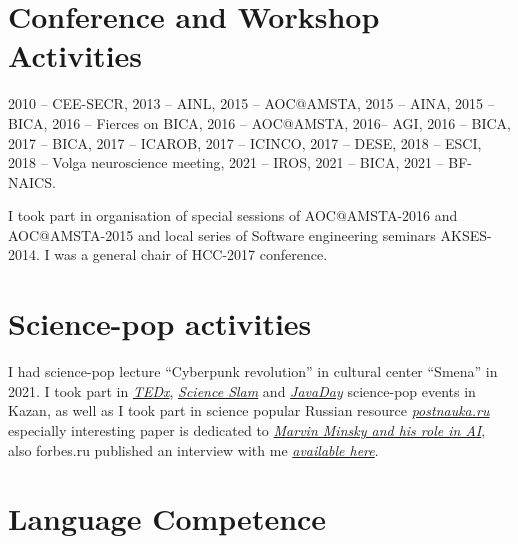 \documentclass{moderncv}
\begin{document}
\nocite{*}
\printbibliography[title={Selected papers}]

    \section{Conference and Workshop Activities}
    2010 -- CEE-SECR, 2013 -- AINL, 2015 -- AOC@AMSTA, 2015 -- AINA, 2015 -- BICA, 2016 -- Fierces on BICA, 2016 -- AOC@AMSTA, 2016-- AGI, 2016 -- BICA, 2017 -- BICA, 2017 -- ICAROB, 2017 -- ICINCO, 2017 -- DESE, 2018 -- ESCI, 2018 -- Volga neuroscience meeting, 2021 -- IROS, 2021 -- BICA, 2021 -- BF-NAICS.

    I took part in organisation of special sessions of AOC@AMSTA-2016 and AOC@AMSTA-2015 and local series of Software engineering seminars AKSES-2014. I was a general chair of HCC-2017 conference.

    \section{Science-pop activities}
    I had science-pop lecture ``Cyberpunk revolution'' in cultural center ``Smena'' in 2021.
    I took part in \href{https://www.youtube.com/watch?v=BLvS7h3kRbo}{\emph{TEDx}}, \href{https://vk.com/video-87488544_171504962}{\emph{Science Slam}} and \href{https://www.youtube.com/watch?v=sLLKxvUEA7E}{\emph{JavaDay}} science-pop events in Kazan, as well as I took part in science popular Russian resource \href{https://postnauka.ru/author/talanov}{\emph{postnauka.ru}} especially interesting paper is dedicated to \href{https://postnauka.ru/faq/58727}{\emph{Marvin Minsky and his role in AI}}, also forbes.ru published an interview with me \href{http://www.forbes.ru/mneniya-column/288097-kak-sozdat-emotsionalnyi-iskusstvennyi-intellekt}{\emph{available here}}.

    \section{Language Competence}


\end{document}

